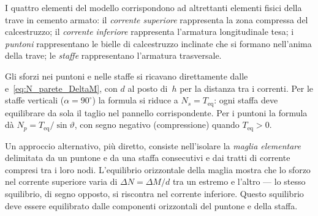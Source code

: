 I quattro elementi del modello corrispondono ad
altrettanti elementi fisici della trave in cemento
armato: il \emph{corrente superiore} rappresenta
la zona compressa del calcestruzzo; il
\emph{corrente inferiore} rappresenta l'armatura
longitudinale tesa; i \emph{puntoni} rappresentano
le bielle di calcestruzzo inclinate che si formano
nell'anima della trave; le \emph{staffe} rappresentano
l'armatura trasversale.

Gli sforzi nei puntoni e nelle staffe si ricavano
direttamente dalle~
e~\eqref{eq:N_parete_DeltaM}, con $d$ al posto
di~$h$ per la distanza tra i correnti.
Per le staffe verticali ($\alpha = 90^\circ$) la
formula si riduce a $N_s = T_\text{eq}$: ogni staffa
deve equilibrare da sola il taglio nel pannello
corrispondente. Per i puntoni la formula dà
$N_p = T_\text{eq}/\sin\vartheta$, con segno
negativo (compressione) quando $T_\text{eq} > 0$.






Un approccio alternativo, più diretto, consiste
nell'isolare la \emph{maglia elementare} delimitata
da un puntone e da una staffa consecutivi e dai
tratti di corrente compresi tra i loro nodi.
L'equilibrio orizzontale della maglia mostra che
lo sforzo nel corrente superiore varia di
$\Delta N = \Delta M / d$ tra un estremo e l'altro
--- lo stesso squilibrio, di segno opposto, si
riscontra nel corrente inferiore. Questo squilibrio
deve essere equilibrato dalle componenti orizzontali
del puntone e della staffa.

